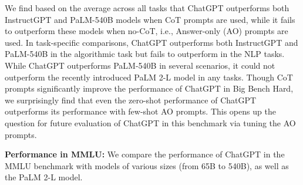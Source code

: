 \documentclass[11pt]{article}
\begin{document}
We find based on the average across all tasks that ChatGPT outperforms both InstructGPT and PaLM-540B models when CoT prompts are used, while it fails to outperform these models when no-CoT, i.e., Answer-only (AO) prompts are used. In task-specific comparisons, ChatGPT outperforms both InstructGPT and PaLM-540B in the algorithmic task but fails to outperform in the NLP tasks. While ChatGPT outperforms PaLM-540B in several scenarios, it could not outperform the recently introduced PaLM 2-L model in any tasks. Though CoT prompts significantly improve the performance of ChatGPT in Big Bench Hard, we surprisingly find that even the zero-shot performance of ChatGPT outperforms its performance with few-shot AO prompts. {This opens up the question for future evaluation of ChatGPT in this benchmark via tuning the AO prompts}. 












\begin{table*}
\centering
{}
\caption{Performance of ChatGPT on the \textbf{MMLU} benchmark. \emph{NA} refers to \emph{Not Available}.}
\label{tab:mmlu_summary}
\vspace{-.5cm}
\end{table*} 
\textbf{Performance in MMLU:} We compare the performance of ChatGPT in the MMLU benchmark with models of various sizes (from 65B to 540B), as well as the PaLM 2-L \cite{palm2} model. 
\end{document}
